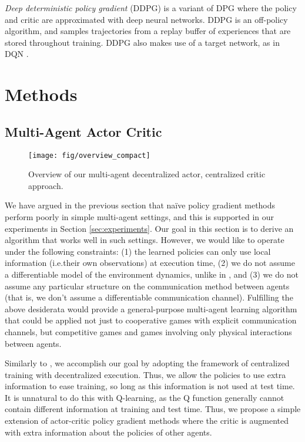 \documentclass{article}
\begin{document}
\textit{Deep deterministic policy gradient} (DDPG) \cite{lillicrap2015continuous} is a variant of DPG where the policy  and critic  are approximated with deep neural networks. DDPG is an off-policy algorithm, and samples trajectories from a replay buffer of experiences that are stored throughout training. DDPG also makes use of a target network, as in DQN \cite{mnih2015human}.






\section{Methods}
\label{sec:methods}
\subsection{Multi-Agent Actor Critic}\label{sec:maac}

\begin{wrapfigure}{r}{0.45\textwidth}
\vspace{-20mm}
\texttt{[image: fig/overview\_compact]}
\caption{\label{fig:model} Overview of our multi-agent decentralized actor, centralized critic approach.\vspace{-2mm}}
\end{wrapfigure}

We have argued in the previous section that na{\"i}ve policy gradient methods perform poorly in simple multi-agent settings, and this is supported in our experiments in Section \ref{sec:experiments}. Our goal in this section is to derive an algorithm that works well in such settings. However, we would like to operate under the following constraints: (1) the learned policies can only use local information (i.e.\@ their own observations) at execution time, (2) we do not assume a differentiable model of the environment dynamics, unlike in \cite{mordatch2017emergence}, and (3) we do not assume any particular structure on the communication method between agents (that is, we don't assume a differentiable communication channel). Fulfilling the above desiderata would provide a general-purpose multi-agent learning algorithm that could be applied not just to cooperative games with explicit communication channels, but competitive games and games involving only physical interactions between agents.



Similarly to \cite{foerster16b}, we accomplish our goal by adopting the framework of centralized training with decentralized execution. Thus, we allow the policies to use extra information to ease training, so long as this information is not used at test time. It is unnatural to do this with Q-learning, as the Q function generally cannot contain different information at training and test time. Thus, we propose a simple extension of actor-critic policy gradient methods where the critic is augmented with extra information about the policies of other agents. 
\end{document}
